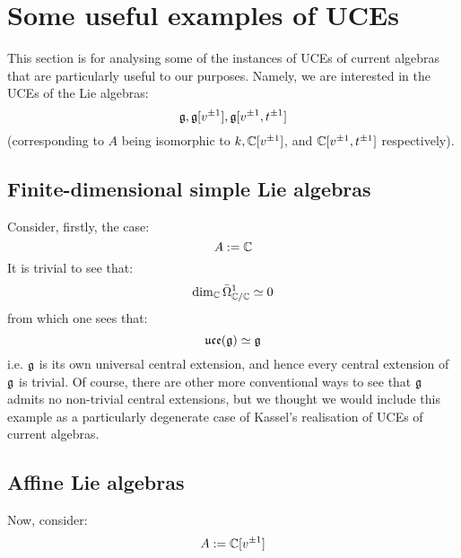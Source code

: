 \section{Some useful examples of UCEs}
    This section is for analysing some of the instances of UCEs of current algebras that are particularly useful to our purposes. Namely, we are interested in the UCEs of the Lie algebras:
        $$\mathfrak{g}, \mathfrak{g}[v^{\pm 1}], \mathfrak{g}[v^{\pm 1}, t^{\pm 1}]$$
    (corresponding to $A$ being isomorphic to $k, \mathbb{C}[v^{\pm 1}]$, and $\mathbb{C}[v^{\pm 1}, t^{\pm 1}]$ respectively). 

    \subsection{Finite-dimensional simple Lie algebras}
        Consider, firstly, the case:
            $$A := \mathbb{C}$$
        It is trivial to see that:
            $$\dim_{\mathbb{C}} \bar{\Omega}^1_{\mathbb{C}/\mathbb{C}} \simeq 0$$
        from which one sees that:
            $$\mathfrak{uce}(\mathfrak{g}) \simeq \mathfrak{g}$$
        i.e. $\mathfrak{g}$ is its own universal central extension, and hence every central extension of $\mathfrak{g}$ is trivial. Of course, there are other more conventional ways to see that $\mathfrak{g}$ admits no non-trivial central extensions, but we thought we would include this example as a particularly degenerate case of Kassel's realisation of UCEs of current algebras.

    \subsection{Affine Lie algebras}
        Now, consider:
            $$A := \mathbb{C}[v^{\pm 1}]$$
    
